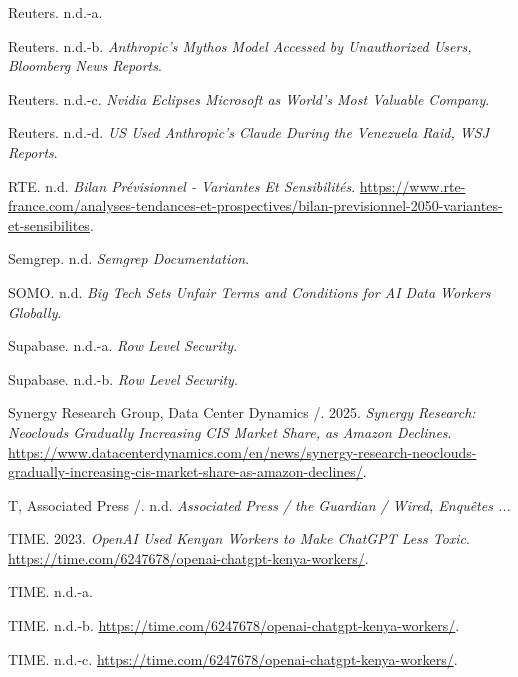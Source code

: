 \documentclass[
  10pt,
  a4paper,
  DIV=11,
  numbers=noendperiod,
  oneside]{scrreprt}
\newlength{\cslhangindent}
\newenvironment{CSLReferences}[2] %
 {\begin{list}{}{%
  \setlength{\itemindent}{0pt}
  \setlength{\leftmargin}{0pt}
  \setlength{\parsep}{0pt}
  \ifodd #1
   \setlength{\leftmargin}{\cslhangindent}
   \setlength{\itemindent}{-1\cslhangindent}
  \fi
  \setlength{\itemsep}{#2\baselineskip}}}
 {\end{list}}
\let\oldemph\emph
\renewcommand{\emph}[1]{\oldemph{\textcolor{cmmgray}{#1}}}
\begin{document}
\begin{CSLReferences}{1}{1}
Reuters. n.d.-a.

Reuters. n.d.-b. \emph{Anthropic's Mythos Model Accessed by Unauthorized
Users, Bloomberg News Reports}.

Reuters. n.d.-c. \emph{Nvidia Eclipses Microsoft as World's Most
Valuable Company}.

Reuters. n.d.-d. \emph{US Used Anthropic's Claude During the Venezuela
Raid, WSJ Reports}.

RTE. n.d. \emph{Bilan Prévisionnel - Variantes Et Sensibilités}.
\url{https://www.rte-france.com/analyses-tendances-et-prospectives/bilan-previsionnel-2050-variantes-et-sensibilites}.

Semgrep. n.d. \emph{Semgrep Documentation}.

SOMO. n.d. \emph{Big Tech Sets Unfair Terms and Conditions for AI Data
Workers Globally}.

Supabase. n.d.-a. \emph{Row Level Security}.

Supabase. n.d.-b. \emph{Row Level Security}.

Synergy Research Group, Data Center Dynamics /. 2025. \emph{Synergy
Research: Neoclouds Gradually Increasing CIS Market Share, as Amazon
Declines}.
\url{https://www.datacenterdynamics.com/en/news/synergy-research-neoclouds-gradually-increasing-cis-market-share-as-amazon-declines/}.

T, Associated Press /. n.d. \emph{Associated Press / the Guardian /
Wired, Enquêtes ...}

TIME. 2023. \emph{OpenAI Used Kenyan Workers to Make ChatGPT Less
Toxic}. \url{https://time.com/6247678/openai-chatgpt-kenya-workers/}.

TIME. n.d.-a.

TIME. n.d.-b.
\url{https://time.com/6247678/openai-chatgpt-kenya-workers/}.

TIME. n.d.-c.
\url{https://time.com/6247678/openai-chatgpt-kenya-workers/}.


\end{CSLReferences}
\end{document}

